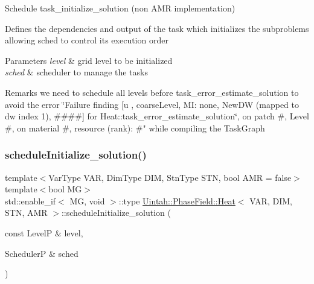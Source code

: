Schedule task\+\_\+initialize\+\_\+solution (non A\+MR implementation) 

Defines the dependencies and output of the task which initializes the subproblems allowing sched to control its execution order


\begin{DoxyParams}{Parameters}
{\em level} & grid level to be initialized \\
\hline
{\em sched} & scheduler to manage the tasks\\
\hline
\end{DoxyParams}
\begin{DoxyRemark}{Remarks}
we need to schedule all levels before task\+\_\+error\+\_\+estimate\+\_\+solution to avoid the error \char`\"{}\+Failure finding \mbox{[}u , coarse\+Level, M\+I\+: none, New\+D\+W
(mapped to dw index 1), \#\#\#\#\mbox{]} for Heat\+::task\+\_\+error\+\_\+estimate\+\_\+solution\char`\"{}, on patch \#, Level \#, on material \#, resource (rank)\+: \#" while compiling the Task\+Graph 
\end{DoxyRemark}
\mbox{\label{classUintah_1_1PhaseField_1_1Heat_a0ee0e3cbb32c28fd0cb4b567cb0dbd9b}} 
\subsubsection{\texorpdfstring{schedule\+Initialize\+\_\+solution()}{scheduleInitialize\_solution()}\hspace{0.1cm}{\footnotesize\ttfamily [2/2]}}
{\footnotesize\ttfamily template$<$Var\+Type V\+AR, Dim\+Type D\+IM, Stn\+Type S\+TN, bool A\+MR = false$>$ \\
template$<$bool MG$>$ \\
std\+::enable\+\_\+if$<$ MG, void $>$\+::type \hyperlink{classUintah_1_1PhaseField_1_1Heat}{Uintah\+::\+Phase\+Field\+::\+Heat}$<$ V\+AR, D\+IM, S\+TN, A\+MR $>$\+::schedule\+Initialize\+\_\+solution (\begin{DoxyParamCaption}\item[{const LevelP \&}]{level,  }\item[{SchedulerP \&}]{sched }\end{DoxyParamCaption})\hspace{0.3cm}{\ttfamily [protected]}}



